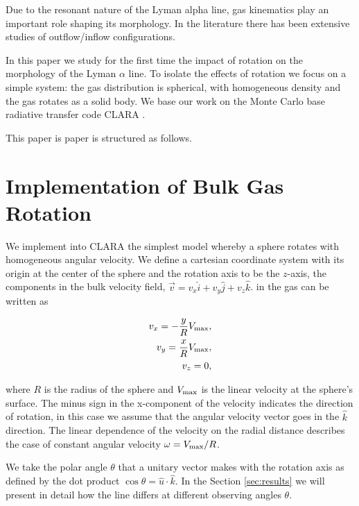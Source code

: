 \documentclass[usenatbib]{mn2e}
\begin{document}
Due to the resonant nature of the Lyman alpha line, gas kinematics
play an important role shaping its morphology. In the literature there
has been extensive studies of outflow/inflow configurations. 

In this paper we study for the first time the impact of rotation on
the morphology of the Lyman $\alpha$ line. To isolate the effects of
rotation we focus on a simple system: the gas distribution is
spherical, with homogeneous density and the gas rotates as a solid
body. We base our work on the Monte Carlo base radiative transfer code
CLARA \citep{CLARA}. 

This paper is paper is structured as follows.



\section{Implementation of Bulk Gas Rotation}
\label{sec:implementation}

We implement into CLARA the simplest model whereby a sphere rotates
with homogeneous angular velocity. We define a cartesian coordinate
system with its origin at the center of the sphere and the rotation
axis to be the $z$-axis, the components in the bulk velocity field, $\vec{v}
= v_{x}\hat{i} + v_{y}\hat{j} + v_{z}\hat{k}$. in the gas can be written as 
 
\begin{subequations}
\begin{align}
    v_{x}=-\dfrac{y}{R}V_{\rm max}, \label{subeq1}\\
    v_{y}=\dfrac{x}{R}V_{\rm max}, \label{subeq2}\\
    v_{z}=0, \label{subeq3}
\end{align}
\end{subequations}

where $R$ is the radius of the sphere and $V_{\rm max}$ is the linear
velocity at the sphere's surface. The minus sign in the x-component of
the velocity indicates the direction of rotation, in this case we
assume that the angular velocity vector goes in the $\hat{k}$
direction.  The linear dependence of the velocity on the radial
distance describes the case of constant angular velocity
$\omega=V_{\rm max}/R$.  

We take the polar angle $\theta$ that a unitary vector makes with the
rotation axis as defined by the dot product $\cos\theta =
{\hat{u}\cdot\hat{k}}$. In the Section \ref{sec:results} we will
present in detail how the line differs at different observing angles
$\theta$. 
\end{document}
